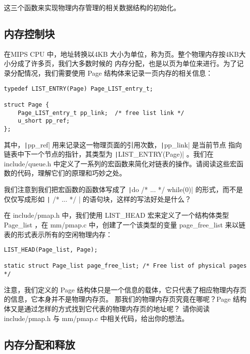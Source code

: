   这三个函数来实现物理内存管理的相关数据结构的初始化。

\subsection{内存控制块}

在MIPS CPU 中，地址转换以4KB 大小为单位，称为页。整个物理内存按4KB大小分成了许多页，我们大多数时候的
内存分配，也是以页为单位来进行。为了记录分配情况，我们需要使用 Page 结构体来记录一页内存的相关信息：

\begin{verbatim}
typedef LIST_ENTRY(Page) Page_LIST_entry_t;

struct Page {
    Page_LIST_entry_t pp_link;  /* free list link */
    u_short pp_ref;
};
\end{verbatim}

其中，\texttt|pp_ref| 用来记录这一物理页面的引用次数，\texttt|pp_link| 是当前节点
指向链表中下一个节点的指针，其类型为 \texttt|LIST_ENTRY(Page)| 。我们在 include/queue.h
中定义了一系列的宏函数来简化对链表的操作。请阅读这些宏函数的代码，理解它们的原理和巧妙之处。

\begin{thinking}\label{think-do_while}
我们注意到我们把宏函数的函数体写成了 \texttt|do { /* ... */ } while(0)| 的形式，而不是
仅仅写成形如
\texttt|{ /* ... */ }| 的语句块，这样的写法好处是什么？
\end{thinking}

在 include/pmap.h 中，我们使用 LIST\_HEAD 宏来定义了一个结构体类型 Page\_list ，在 mm/pmap.c
中，创建了一个该类型的变量 page\_free\_list 来以链表的形式表示所有的空闲物理内存：

\begin{verbatim}
LIST_HEAD(Page_list, Page);

static struct Page_list page_free_list; /* Free list of physical pages */
\end{verbatim}

\begin{thinking}\label{think-Struct page}
注意，我们定义的 Page 结构体只是一个信息的载体，它只代表了相应物理内存页的信息，它本身并不是物理内存页。
那我们的物理内存页究竟在哪呢？Page 结构体又是通过怎样的方式找到它代表的物理内存页的地址呢？
请你阅读 include/pmap.h 与 mm/pmap.c 中相关代码，给出你的想法。
\end{thinking}

\subsection{内存分配和释放}

